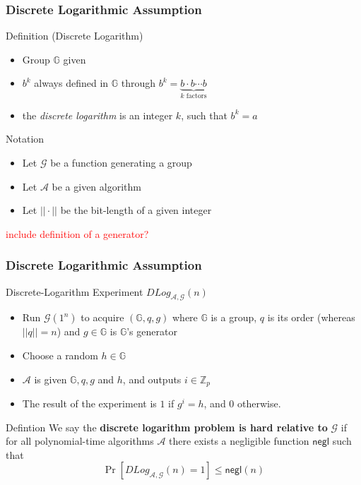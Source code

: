 \begin{frame}
	\frametitle{Discrete Logarithmic Assumption}

	\begin{block}{Definition (Discrete Logarithm)}
		\begin{itemize}
			\item Group $\mathbb{G}$ given
			\item $b^k$ always defined in $\mathbb{G}$ through $b^k = \underbrace{b\cdot b \cdots b}_{k\text{ factors}}$
			\item the \textit{discrete logarithm} is an integer $k$, such that $b^k = a$
		\end{itemize}
	\end{block}
	\begin{block}{Notation}
		\begin{itemize}
			\item Let $\mathcal{G}$ be a function generating a group
			\item Let $\mathcal{A}$ be a given algorithm
			\item Let $||\cdot||$ be the bit-length of a given integer
		\end{itemize}
	\end{block}
	\textcolor{red}{include definition of a generator?}
\end{frame}

\begin{frame}
	\frametitle{Discrete Logarithmic Assumption}
	\begin{block}{Discrete-Logarithm Experiment $DLog_{\mathcal{A}, \mathcal{G}}(n)$} %
		\begin{itemize}
			\item Run $\mathcal{G}(1^n)$ to acquire $(\mathbb{G}, q, g)$ where $\mathbb{G}$ is a group, $q$ is its order (whereas $||q|| = n$) and $g\in \mathbb{G}$ is $\mathbb{G}$'s generator
			\item Choose a random $h\in\mathbb{G}$
			\item $\mathcal{A}$ is given $\mathbb{G}, q, g$ and $h$, and outputs $i\in \mathbb{Z}_p$
			\item The result of the experiment is $1$ if $g^i = h$, and $0$ otherwise.
		\end{itemize}
	\end{block}
	\begin{block}{Defintion}
		We say the \textbf{discrete logarithm problem is hard relative to} $\mathcal{G}$ if for all polynomial-time algorithms $\mathcal{A}$ there exists a negligible function $\textsf{negl}$ such that 
			$$\Pr[DLog_{\mathcal{A}, \mathcal{G}}(n) = 1] \leq \textsf{negl}(n)$$
	\end{block}
\end{frame}